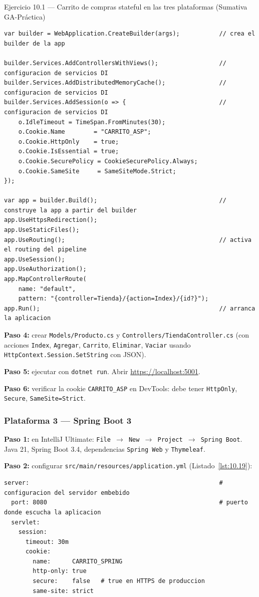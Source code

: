 \documentclass[11pt,a4paper,openany]{book}
\begin{document}
\begin{cajaejercicio}{Ejercicio 10.1 --- Carrito de compras stateful en las tres plataformas (Sumativa GA-Práctica)}
\begin{lstlisting}[style=cs,caption={Program.cs},label=lst:10.18]
var builder = WebApplication.CreateBuilder(args);           // crea el builder de la app

builder.Services.AddControllersWithViews();                 // configuracion de servicios DI
builder.Services.AddDistributedMemoryCache();               // configuracion de servicios DI
builder.Services.AddSession(o => {                          // configuracion de servicios DI
    o.IdleTimeout = TimeSpan.FromMinutes(30);
    o.Cookie.Name        = "CARRITO_ASP";
    o.Cookie.HttpOnly    = true;
    o.Cookie.IsEssential = true;
    o.Cookie.SecurePolicy = CookieSecurePolicy.Always;
    o.Cookie.SameSite     = SameSiteMode.Strict;
});

var app = builder.Build();                                  // construye la app a partir del builder
app.UseHttpsRedirection();
app.UseStaticFiles();
app.UseRouting();                                           // activa el routing del pipeline
app.UseSession();
app.UseAuthorization();
app.MapControllerRoute(
    name: "default",
    pattern: "{controller=Tienda}/{action=Index}/{id?}");
app.Run();                                                  // arranca la aplicacion
\end{lstlisting}

\textbf{Paso 4:} crear \texttt{Models/Producto.cs} y
\texttt{Controllers/TiendaController.cs} (con acciones
\texttt{Index}, \texttt{Agregar}, \texttt{Carrito},
\texttt{Eliminar}, \texttt{Vaciar} usando
\texttt{HttpContext.Session.SetString} con JSON).

\textbf{Paso 5:} ejecutar con \texttt{dotnet run}. Abrir
\url{https://localhost:5001}.

\textbf{Paso 6:} verificar la cookie \texttt{CARRITO\_ASP} en
DevTools: debe tener \texttt{HttpOnly}, \texttt{Secure},
\texttt{SameSite=Strict}.

\subsubsection*{Plataforma 3 --- Spring Boot 3}

\textbf{Paso 1:} en IntelliJ Ultimate:
\texttt{File $\rightarrow$ New $\rightarrow$ Project $\rightarrow$ Spring Boot}.
Java 21, Spring Boot 3.4, dependencias \texttt{Spring Web} y
\texttt{Thymeleaf}.

\textbf{Paso 2:} configurar \texttt{src/main/resources/application.yml} (Listado~\ref{lst:10.19}):

\begin{lstlisting}[style=yaml,caption={application.yml},label=lst:10.19]
server:                                                     # configuracion del servidor embebido
  port: 8080                                                # puerto donde escucha la aplicacion
  servlet:
    session:
      timeout: 30m
      cookie:
        name:      CARRITO_SPRING
        http-only: true
        secure:    false   # true en HTTPS de produccion
        same-site: strict
\end{lstlisting}


\end{cajaejercicio}
\end{document}

